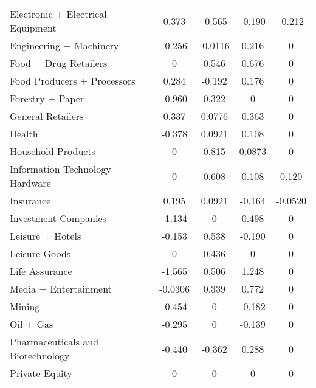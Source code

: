 {\begin{longtable}{l*{4}{c}}
Electronic + Electrical Equipment&    0.373         &   -0.565         &   -0.190         &   -0.212         \\
Engineering + Machinery&   -0.256         &  -0.0116         &    0.216         &        0         \\
Food + Drug Retailers&        0         &    0.546         &    0.676         &        0         \\
Food Producers + Processors&    0.284         &   -0.192         &    0.176         &        0         \\
Forestry + Paper&   -0.960         &    0.322         &        0         &        0         \\
General Retailers&    0.337         &   0.0776         &    0.363         &        0         \\
Health          &   -0.378         &   0.0921         &    0.108         &        0         \\
Household Products&        0         &    0.815\sym{*}  &   0.0873         &        0         \\
Information Technology Hardware&        0         &    0.608         &    0.108         &    0.120         \\
Insurance       &    0.195         &   0.0921         &   -0.164         &  -0.0520         \\
Investment Companies&   -1.134         &        0         &    0.498         &        0         \\
Leisure + Hotels&   -0.153         &    0.538         &   -0.190         &        0         \\
Leisure Goods   &        0         &    0.436         &        0         &        0         \\
Life Assurance  &   -1.565\sym{**} &    0.506         &    1.248\sym{**} &        0         \\
Media + Entertainment&  -0.0306         &    0.339         &    0.772\sym{*}  &        0         \\
Mining          &   -0.454         &        0         &   -0.182         &        0         \\
Oil + Gas       &   -0.295         &        0         &   -0.139         &        0         \\
Pharmaceuticals and Biotechnology&   -0.440         &   -0.362         &    0.288         &        0         \\
Private Equity  &        0         &        0         &        0         &        0         \\

\end{longtable}}
